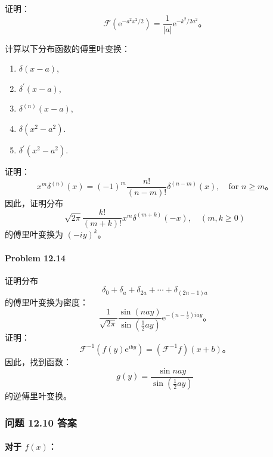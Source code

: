 \begin{problem}\label{pro:12.11}
  证明：
 $$
\mathcal{F}\left(\mathrm{e}^{-a^{2} x^{2} / 2}\right) = \frac{1}{|a|} \mathrm{e}^{-k^{2} / 2 a^{2}}。
$$
\end{problem}
\begin{problem}\label{pro:12.12}
  计算以下分布函数的傅里叶变换： 
  \begin{enumerate}[label=(\alph*)]
    \item $\delta(x-a)$,
    \item $\delta^{\prime}(x-a)$,
    \item $\delta^{(n)}(x-a)$,
    \item $\delta\left(x^{2}-a^{2}\right)$.
    \item $\delta^{\prime}\left(x^{2}-a^{2}\right)$.
  \end{enumerate}
\end{problem}
\begin{problem}\label{pro:12.13}
  
证明：
$$
x^{m} \delta^{(n)}(x) = (-1)^{m} \frac{n!}{(n-m)!} \delta^{(n-m)}(x), \quad \text{for } n \geq m。
$$
因此，证明分布
$$
\sqrt{2 \pi} \frac{k!}{(m+k)!} x^{m} \delta^{(m+k)}(-x), \quad (m, k \geq 0)
$$
的傅里叶变换为 $(-i y)^{k}$。

\paragraph{Problem 12.14}\label{problem-12.14}

证明分布
$$
\delta_{0} + \delta_{a} + \delta_{2 a} + \cdots + \delta_{(2 n-1) a}
$$
的傅里叶变换为密度：
$$
\frac{1}{\sqrt{2 \pi}} \frac{\sin (n a y)}{\sin \left(\frac{1}{2} a y\right)} \mathrm{e}^{-\left(n-\frac{1}{2}\right) i a y}。
$$
证明：
$$
\mathcal{F}^{-1}\left(f(y) \mathrm{e}^{i b y}\right) = \left(\mathcal{F}^{-1} f\right)(x+b)。
$$
因此，找到函数：
$$
g(y) = \frac{\sin n a y}{\sin \left(\frac{1}{2} a y\right)}
$$
的逆傅里叶变换。
\end{problem}


\subsubsection{问题 12.10 答案}

\paragraph{\texorpdfstring{对于
$f(x)$：}{对于 f(x)：}}\label{ux5bf9ux4e8e-fx}

